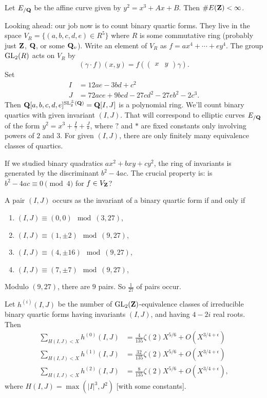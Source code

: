 \begin{theorem}
Let $E_{/\mathbf{Q}}$ be the affine curve given by $y^2=x^3+A x+B$. Then 
$\# E(\mathbf{Z})<\infty$. 
\end{theorem}

Looking ahead: our job now is to count binary quartic forms. They live 
in the space $V_R=\{(a,b,c,d,e)\in R^5\}$ where $R$ is some commutative 
ring (probably just $\mathbf{Z}$, $\mathbf{Q}$, or some $\mathbf{Q}_v$). Write an element of 
$V_R$ as $f=a x^4 + \cdots + e y^4$. The group 
$\operatorname{GL}_2(R)$ acts on $V_R$ by 
\[
  (\gamma\cdot f)(x,y) = f\left(\begin{pmatrix} x & y \end{pmatrix} \gamma\right) .
\]
Set 
\begin{align*}
  I &=12 a e-3 b d+c^2 \\
  J &= 72 a c e+9 b c d-27 c d^2 - 27 e b^2 - 2 c^3 .
\end{align*}
Then $\mathbf{Q}[a,b,c,d,e]^{\operatorname{SL}_2^\pm(\mathbf{Q})} = \mathbf{Q}[I,J]$ is a polynomial ring. 
We'll count binary quartics with given invariant $(I,J)$. That will correspond 
to elliptic curves $E_{/\mathbf{Q}}$ of the form $y^2=x^3+\frac I ? + \frac J \ast$, 
where $?$ and $\ast$ are fixed constants only involving powers of $2$ and $3$. 
For given $(I,J)$, there are only finitely many equivalence classes of 
quartics. 

If we studied binary quadratics $a x^2+b x y+c y^2$, the ring of invariants 
is generated by the discriminant $b^2-4 a c$. The crucial property is: is 
$b^2-4 a c\equiv 0\pmod 4$ for $f\in V_{\mathbf{Z}}$?

\begin{theorem}
A pair $(I,J)$ occurs as the invariant of a binary quartic form if and only if 
\begin{enumerate}
  \item $(I,J)\equiv (0,0)\mod{(3,27)}$, 
  \item $(I,J)\equiv (1,\pm 2)\mod{(9,27)}$,
  \item $(I,J)\equiv (4,\pm 16)\mod{(9,27)}$,
  \item $(I,J)\equiv (7,\pm 7)\mod{(9,27)}$,
\end{enumerate}
\end{theorem}

Modulo $(9,27)$, there are $9$ pairs. So $\frac{1}{27}$ of pairs occur. 

\begin{theorem}
Let $h^{(i)}(I,J)$ be the number of $\operatorname{GL}_2(\mathbf{Z})$-equivalence classes of 
irreducible binary quartic forms having invariants $(I,J)$, and having 
$4-2 i$ real roots. Then 
\begin{align*}
  \sum_{H(I,J)< X} h^{(0)}(I,J) &= \frac{4}{135} \zeta(2) X^{5/6} + O(X^{3/4+\epsilon}) \\
  \sum_{H(I,J)<X} h^{(1)}(I,J) &= \frac{32}{135} \zeta(2) X^{5/6}+O(X^{3/4+\epsilon}) \\
  \sum_{H(I,J)<X} h^{(2)}(I,J) &= \frac{8}{135} \zeta(2) X^{5/6} + O(X^{3/4+\epsilon}) ,
\end{align*}
where $H(I,J) = \max(|I|^3,J^2)$ [with some constants]. 
\end{theorem}

